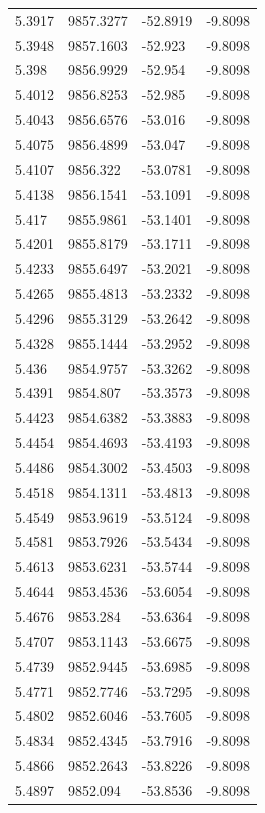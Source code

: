 \begin{table}[H]
\begin{tabular}{llll}
5.3917 & 9857.3277 & -52.8919 & -9.8098 \\
5.3948 & 9857.1603 & -52.923 & -9.8098 \\
5.398 & 9856.9929 & -52.954 & -9.8098 \\
5.4012 & 9856.8253 & -52.985 & -9.8098 \\
5.4043 & 9856.6576 & -53.016 & -9.8098 \\
5.4075 & 9856.4899 & -53.047 & -9.8098 \\
5.4107 & 9856.322 & -53.0781 & -9.8098 \\
5.4138 & 9856.1541 & -53.1091 & -9.8098 \\
5.417 & 9855.9861 & -53.1401 & -9.8098 \\
5.4201 & 9855.8179 & -53.1711 & -9.8098 \\
5.4233 & 9855.6497 & -53.2021 & -9.8098 \\
5.4265 & 9855.4813 & -53.2332 & -9.8098 \\
5.4296 & 9855.3129 & -53.2642 & -9.8098 \\
5.4328 & 9855.1444 & -53.2952 & -9.8098 \\
5.436 & 9854.9757 & -53.3262 & -9.8098 \\
5.4391 & 9854.807 & -53.3573 & -9.8098 \\
5.4423 & 9854.6382 & -53.3883 & -9.8098 \\
5.4454 & 9854.4693 & -53.4193 & -9.8098 \\
5.4486 & 9854.3002 & -53.4503 & -9.8098 \\
5.4518 & 9854.1311 & -53.4813 & -9.8098 \\
5.4549 & 9853.9619 & -53.5124 & -9.8098 \\
5.4581 & 9853.7926 & -53.5434 & -9.8098 \\
5.4613 & 9853.6231 & -53.5744 & -9.8098 \\
5.4644 & 9853.4536 & -53.6054 & -9.8098 \\
5.4676 & 9853.284 & -53.6364 & -9.8098 \\
5.4707 & 9853.1143 & -53.6675 & -9.8098 \\
5.4739 & 9852.9445 & -53.6985 & -9.8098 \\
5.4771 & 9852.7746 & -53.7295 & -9.8098 \\
5.4802 & 9852.6046 & -53.7605 & -9.8098 \\
5.4834 & 9852.4345 & -53.7916 & -9.8098 \\
5.4866 & 9852.2643 & -53.8226 & -9.8098 \\
5.4897 & 9852.094 & -53.8536 & -9.8098 \\

\end{tabular}
\end{table}
